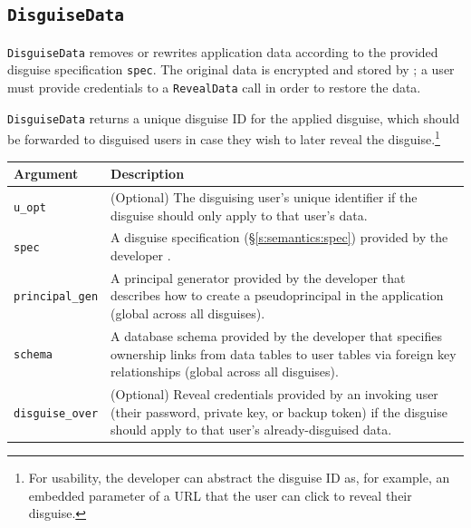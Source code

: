 \subsection{\texttt{DisguiseData}}
    \texttt{DisguiseData} removes or rewrites application data according to the
    provided disguise specification \texttt{spec}. The original data is
    encrypted and stored by \sys; a user must provide credentials to a
    \texttt{RevealData} call in order to restore the data.

    \texttt{DisguiseData} returns a unique disguise ID for the applied disguise,
    which should be forwarded to disguised users in case they wish to later
    reveal the disguise.\footnote{For usability, the developer can abstract the
    disguise ID as, for example, an embedded parameter of a URL that the user
    can click to reveal their disguise.}

    \begin{center}
    \begin{longtable}{|m{}|m{}|}
        \hline
        \textbf{Argument} & \textbf{Description} \\
        \hline
        \texttt{u\_opt}& (Optional) The disguising user's unique identifier if
        the disguise should only apply to that user's data.\\ 
        \hline
        \texttt{spec}& A disguise specification (\S\ref{s:semantics:spec})
        provided by the developer .\\

        \hline
        \texttt{principal\_gen}& A principal generator provided by the developer
        that describes how to create a pseudoprincipal in the application
        (global across all disguises).\\
        \hline
        \texttt{schema}& A database schema provided by the developer that
        specifies ownership links from data tables to user tables via foreign
        key relationships (global across all disguises).\\

        \hline
        \texttt{disguise\_over}& (Optional) Reveal credentials provided by an
        invoking user (their password, private key, or backup token) if the
        disguise should apply to that user's already-disguised data.
\\
        \hline
    \end{longtable}
    \end{center}
    \vspace{-24pt}

